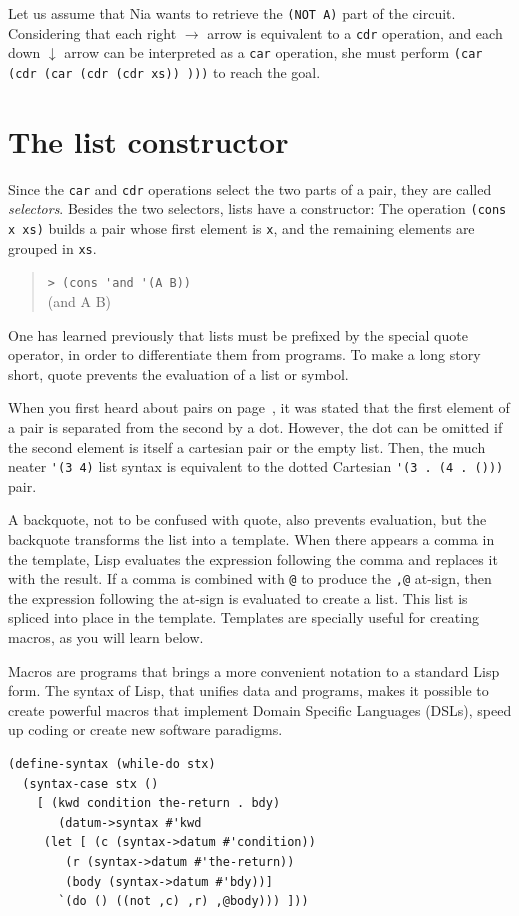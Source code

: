 \documentclass[a4paper,12pt]{book}
\begin{document}
Let us assume that Nia wants to retrieve the
\verb|(NOT A)| part of the circuit. Considering
that each right $\rightarrow$ arrow is equivalent
to a \verb|cdr| operation, and each down $\downarrow$
arrow can be interpreted as a \verb|car| operation,
she must perform \verb|(car (cdr (car (cdr (cdr xs)) )))|
to reach the goal.


\section{The list constructor}
Since the \verb|car| and \verb|cdr| operations
select the two parts of a pair, they are called
{\em selectors}.
Besides the two selectors, lists have a
constructor: The operation \verb|(cons x xs)| builds a pair
whose first element is \verb|x|, and the 
remaining elements are grouped in \verb|xs|.

\begin{quote}
	\verb|> (cons 'and '(A B))|\\
	(and A B)
\end{quote}

One has learned previously that lists must be
prefixed by the special quote operator,
in order to differentiate them from programs.
To make a long story short, quote  prevents
the evaluation of a list or symbol.

When you first heard about pairs on
page~\pageref{page:cartesian-pair},
it was stated that the first element
of a pair is separated from the 
second by a dot. However, the dot
can be omitted if the second element
is itself a cartesian pair or
the empty list. Then,
the  much neater 
\verb|'(3 4)| list syntax is equivalent 
to the dotted Cartesian \verb|'(3 . (4 . ()))| pair.

A backquote, not to be confused with quote, also prevents
evaluation, but the backquote transforms the list 
into a template.
When there appears a comma in the 
template, Lisp evaluates the expression following
the comma
and replaces it with the result. 
If a comma is combined with \verb|@| to produce
the \verb|,@| at-sign,
then the expression following the at-sign 
is evaluated to create a list. This list is
spliced into place in the template. 
Templates are specially useful for creating
macros, as you will learn below.

Macros are programs that brings a more convenient
notation to a standard Lisp form. The syntax of Lisp,
that unifies data and programs, makes it possible to
create powerful macros that implement Domain Specific
Languages (DSLs), speed up coding or create new software
paradigms.
\begin{verbatim}
(define-syntax (while-do stx)
  (syntax-case stx ()
    [ (kwd condition the-return . bdy)
       (datum->syntax #'kwd
	 (let [ (c (syntax->datum #'condition))
		(r (syntax->datum #'the-return))
		(body (syntax->datum #'bdy))]
	   `(do () ((not ,c) ,r) ,@body))) ]))
\end{verbatim}
\end{document}
